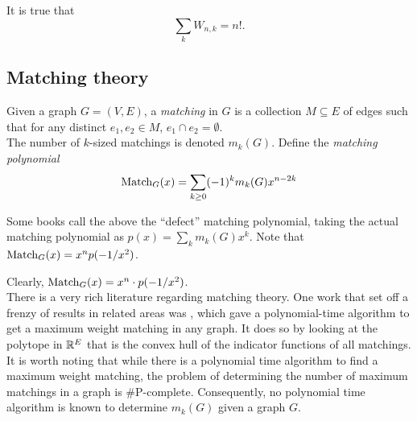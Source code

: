 	\begin{fcor}
		It is true that
		\[ \sum_k W_{n,k} = n!. \]
	\end{fcor}



\subsection{Matching theory}

	\begin{fdef}[Matching]
		Given a graph $G = (V,E)$, a \emph{matching} in $G$ is a collection $M \subseteq E$ of edges such that for any distinct $e_1,e_2 \in M$, $e_1 \cap e_2 = \emptyset$.\\
		The number of $k$-sized matchings is denoted $m_k(G)$. Define the \emph{matching polynomial}
		\[ \operatorname{Match}_G(x) = \sum_{k \ge 0} (-1)^k m_k(G) x^{n-2k} \]
	\end{fdef}
	Some books call the above the ``defect'' matching polynomial, taking the actual matching polynomial as $p(x) = \sum_k m_k(G) x^k$. Note that $\operatorname{Match}_G(x) = x^n p(-1/x^2)$. 
	
	Clearly, $\operatorname{Match}_G(x) = x^n \cdot p(-1/x^2)$.\\

	There is a very rich literature regarding matching theory. One work that set off a frenzy of results in related areas was \cite{Edmonds1965MaximumMA}, which gave a polynomial-time algorithm to get a maximum weight matching in any graph. It does so by looking at the polytope in $\mathbb{R}^{E}$ that is the convex hull of the indicator functions of all matchings.
	It is worth noting that while there is a polynomial time algorithm to find a maximum weight matching, the problem of determining the number of maximum matchings in a graph is \textsf{\#P}-complete. Consequently, no polynomial time algorithm is known to determine $m_k(G)$ given a graph $G$.\\

